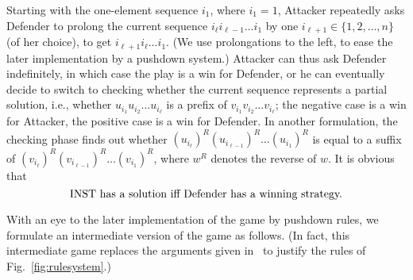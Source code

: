 \documentclass[11pt]{article}
\begin{document}
Starting with the one-element sequence
$i_1$, where $i_1=1$, Attacker repeatedly asks Defender to prolong 
the current sequence 
${i_\ell} {i_{\ell-1}}\dots {i_{1}}$ by one
$i_{\ell+1}\in\{1,2,\dots,n\}$ (of her choice),
to get ${i_{\ell+1}} {i_{\ell}}\dots {i_{1}}$. 
(We use prolongations to the left, to ease the later implementation by
a pushdown system.)
Attacker can thus ask Defender indefinitely, 
in which case the play is
a win for Defender, or he can
eventually decide to
switch to checking whether the current sequence
represents a partial solution, i.e., 
whether $u_{i_1} u_{i_2}\dots u_{i_{\ell}}$ is a prefix of
$v_{i_1} v_{i_2}\dots v_{i_{\ell}}$; the negative case is a win for
Attacker, the positive case is a win for Defender. 
In another formulation, 
the checking phase finds out
whether
 $(u_{i_\ell})^R (u_{i_{\ell-1}})^R\dots (u_{i_{1}})^R$ is equal to 
 a suffix
of 
 $(v_{i_\ell})^R (v_{i_{\ell-1}})^R\dots (v_{i_{1}})^R$, where 
 $w^R$ denotes the reverse of $w$.
It is obvious that 
\begin{equation}\label{eq:soliffwin}
\textnormal{INST has a solution
iff Defender has a winning strategy.} 
\end{equation}

With an eye to the later implementation of the game by pushdown rules,
we formulate an intermediate version of the game as follows.
(In fact, this intermediate game replaces the arguments 
given in~\cite{DBLP:journals/jacm/JancarS08} to justify
the rules of Fig.~\ref{fig:rulesystem}.)
\end{document}
